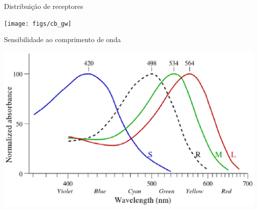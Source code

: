       \begin{slide}[toc=]{Distribuição de receptores}
         \begin{center}
            \texttt{[image: figs/cb\_gw]}
         \end{center}
      \end{slide}
     

      \begin{slide}[toc=]{Sensibilidade ao comprimento de onda}
         \begin{center}
            \includegraphics[width=.8\textwidth]{figs/cb_resp}
         \end{center}
      \end{slide}
      
